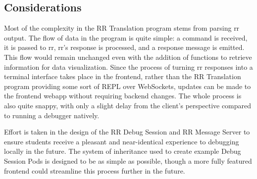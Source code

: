 \documentclass[12pt]{article}
\begin{document}
\subsection{Considerations}

Most of the complexity in the RR Translation program stems from
parsing rr output.  The flow of data in the program is quite simple: a
command is received, it is passed to rr, rr's response is processed,
and a response message is emitted.  This flow would remain unchanged
even with the addition of functions to retrieve information for data
visualization.  Since the process of turning rr responses into a
terminal interface takes place in the frontend, rather than the RR
Translation program providing some sort of REPL over WebSockets,
updates can be made to the frontend webapp without requiring backend
changes.  The whole process is also quite snappy, with only a slight
delay from the client's perspective compared to running a debugger
natively.
\par

Effort is taken in the design of the RR Debug Session and RR Message
Server to ensure students receive a pleasant and near-identical
experience to debugging locally in the future.  The system of
inheritance used to create example Debug Session Pods is designed to
be as simple as possible, though a more fully featured frontend could
streamline this process further in the future.





\end{document}
